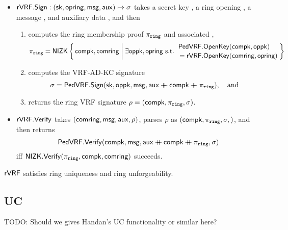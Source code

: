 \begin{itemize}
\item ${\mathsf{rVRF}}.{\mathsf{Sign}} : (\mathsf{sk},\mathsf{opring},\mathsf{msg},\mathsf{aux}) \mapsto \sigma$ takes
 a secret key \sk, a ring opening \openring, a message \msg, and auxiliary data \aux, and then \\
 \begin{enumerate}
 \item computes the ring membership proof $\piring$ and associated \openpk,
  $$ \piring = \NIZK \Setst{ \compk, \comring }{
  \exists \openpk,\openring \textrm{\ s.t.\ } 
  \genfrac{}{}{0pt}{}{\PedVRF.\OpenKey(\compk,\openpk) \quad}{\,\, = \rVRF.\OpenKey(\comring,\openring)}
  } $$
 \item computes the VRF-AD-KC signature
  $$ \sigma = {\mathsf{PedVRF}}.{\mathsf{Sign}}(\mathsf{sk},\mathsf{oppk},\mathsf{msg},\mathsf{aux} \mathbin{+\mkern-10mu+} \mathsf{compk} \mathbin{+\mkern-10mu+} \pi_{\mathtt{ring}}), \quad\textrm{and} $$ %
 \item returns the ring VRF signature $\rho = (\mathsf{compk},\pi_{\mathtt{ring}},\sigma)$.
 \end{enumerate}
\item ${\mathsf{rVRF}}.{\mathsf{Verify}}$ takes $(\mathsf{comring},\mathsf{msg},\mathsf{aux},\rho)$,
 parses $\rho$ as $(\mathsf{compk},\pi_{\mathtt{ring}},\sigma,)$,  and then returns
 $$ {\mathsf{PedVRF}}.{\mathsf{Verify}}(\mathsf{compk},\mathsf{msg},\mathsf{aux} \mathbin{+\mkern-10mu+} \mathsf{compk} \mathbin{+\mkern-10mu+} \pi_{\mathtt{ring}},\sigma) $$
 iff ${\mathsf{NIZK}}.{\mathsf{Verify}}(\pi_{\mathtt{ring}},\mathsf{compk},\mathsf{comring})$ succeeds. 
\end{itemize}

\begin{proposition}\label{prop:pedersen_rvrf}
${\mathsf{rVRF}}$ satisfies ring uniqueness and ring unforgeability.
\end{proposition}


\subsection{UC}

TODO: Should we gives Handan's UC functionality or similar here? 





\endinput










In this, we tie $\sigma$ to $\piring$ by expanding $\sigma$'s auxiliary data with $\piring$.


We now prove security of \rVRF using that
\begin{itemize}
	\item \PedVRF is a secure hiding VRF-AD-KC, and that
	\item our ring commitment scheme satisfies ring commitment correctness.
\end{itemize}

